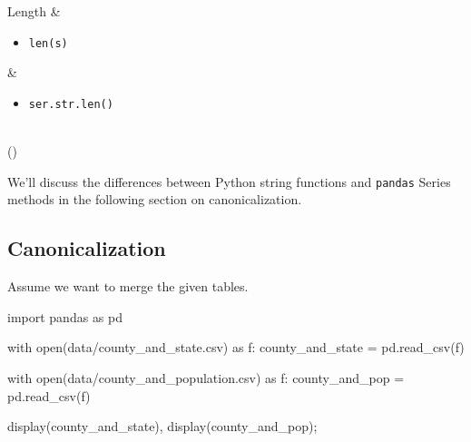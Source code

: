 \documentclass[
  letterpaper,
  DIV=11,
  numbers=noendperiod]{scrreprt}
\newenvironment{Shaded}{\begin{snugshade}}{\end{snugshade}}
\newcommand{\BuiltInTok}[1]{\textcolor[rgb]{0.00,0.23,0.31}{#1}}
\newcommand{\ControlFlowTok}[1]{\textcolor[rgb]{0.00,0.23,0.31}{#1}}
\newcommand{\ImportTok}[1]{\textcolor[rgb]{0.00,0.46,0.62}{#1}}
\newcommand{\NormalTok}[1]{\textcolor[rgb]{0.00,0.23,0.31}{#1}}
\newcommand{\OperatorTok}[1]{\textcolor[rgb]{0.37,0.37,0.37}{#1}}
\newcommand{\StringTok}[1]{\textcolor[rgb]{0.13,0.47,0.30}{#1}}
\providecommand{\tightlist}{%
  \setlength{\itemsep}{0pt}\setlength{\parskip}{0pt}}\usepackage{longtable,booktabs,array}
\begin{document}
\begin{longtable}[]
Length & \begin{minipage}[t]{\linewidth}\raggedright
\begin{itemize}
\tightlist
\item
  \texttt{len(s)}
\end{itemize}
\end{minipage} & \begin{minipage}[t]{\linewidth}\raggedright
\begin{itemize}
\tightlist
\item
  \texttt{ser.str.len()}
\end{itemize}
\end{minipage} \\
\bottomrule()
\end{longtable}

We'll discuss the differences between Python string functions and
\texttt{pandas} Series methods in the following section on
canonicalization.

\hypertarget{canonicalization}{%
\subsection{Canonicalization}\label{canonicalization}}

Assume we want to merge the given tables.

\begin{Shaded}
\begin{Highlighting}[]
\ImportTok{import}\NormalTok{ pandas }\ImportTok{as}\NormalTok{ pd}

\ControlFlowTok{with} \BuiltInTok{open}\NormalTok{(}\StringTok{\textquotesingle{}data/county\_and\_state.csv\textquotesingle{}}\NormalTok{) }\ImportTok{as}\NormalTok{ f:}
\NormalTok{    county\_and\_state }\OperatorTok{=}\NormalTok{ pd.read\_csv(f)}
    
\ControlFlowTok{with} \BuiltInTok{open}\NormalTok{(}\StringTok{\textquotesingle{}data/county\_and\_population.csv\textquotesingle{}}\NormalTok{) }\ImportTok{as}\NormalTok{ f:}
\NormalTok{    county\_and\_pop }\OperatorTok{=}\NormalTok{ pd.read\_csv(f)}
\end{Highlighting}
\end{Shaded}

\begin{Shaded}
\begin{Highlighting}[]
\NormalTok{display(county\_and\_state), display(county\_and\_pop)}\OperatorTok{;}
\end{Highlighting}
\end{Shaded}
\end{document}
